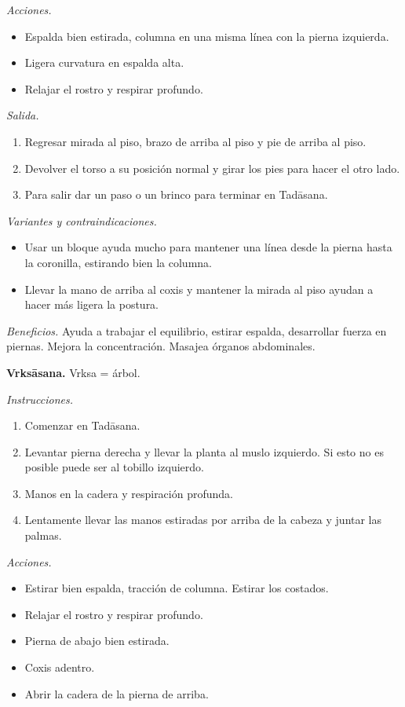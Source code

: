\emph{Acciones.}
\begin{itemize}
\item Espalda bien estirada, columna en una
misma línea con la pierna izquierda.
\item Ligera curvatura en espalda alta.
\item Relajar el rostro y respirar profundo.
\end{itemize}

\emph{Salida.}
\begin{enumerate}
\item Regresar mirada al piso, brazo de
arriba al piso y pie de arriba al piso.
\item Devolver el torso a su posición normal
y girar los pies para hacer el otro lado.
\item Para salir dar un paso o un brinco para
terminar en Tadāsana.
\end{enumerate}

\emph{Variantes y contraindicaciones.}
\begin{itemize}
\item Usar un bloque ayuda mucho para
mantener una línea desde la pierna hasta la
coronilla, estirando bien la columna.
\item Llevar la mano de arriba al coxis y
mantener la mirada al piso ayudan a hacer más
ligera la postura.
\end{itemize}

\emph{Beneficios.} Ayuda a trabajar el
equilibrio, estirar espalda, desarrollar
fuerza en piernas. Mejora la concentración.
Masajea órganos abdominales.

\medskip\noindent\textbf{Vrksāsana.}
Vrksa = árbol.

\emph{Instrucciones.}
\begin{enumerate}
\item Comenzar en Tadāsana.
\item Levantar pierna derecha y llevar la
planta al muslo izquierdo. Si esto no es
posible puede ser al tobillo izquierdo.
\item Manos en la cadera y respiración
profunda.
\item Lentamente llevar las manos estiradas
por arriba de la cabeza y juntar las palmas.
\end{enumerate}

\emph{Acciones.}
\begin{itemize}
\item Estirar bien espalda, tracción de
columna. Estirar los costados.
\item Relajar el rostro y respirar profundo.
\item Pierna de abajo bien estirada.
\item Coxis adentro.
\item Abrir la cadera de la pierna de arriba.
\end{itemize}

